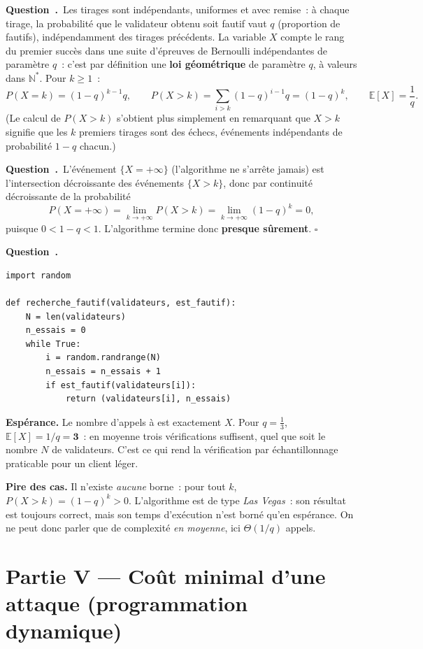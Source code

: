\documentclass[11pt,a4paper]{article}
\renewcommand{\Q}{\medskip\par\stepcounter{qcnt}\noindent\textbf{\color{cnc}Question~\theqcnt.}~}
\begin{document}
\Q Les tirages sont indépendants, uniformes et avec remise~: à chaque tirage, la probabilité
que le validateur obtenu soit fautif vaut $q$ (proportion de fautifs), indépendamment des
tirages précédents. La variable $X$ compte le rang du premier succès dans une suite d'épreuves
de Bernoulli indépendantes de paramètre $q$~: c'est par définition une \textbf{loi géométrique}
de paramètre $q$, à valeurs dans $\mathbb{N}^*$. Pour $k\ge 1$~:
\[ P(X=k) = (1-q)^{k-1}q,\qquad
   P(X>k) = \sum_{i>k}(1-q)^{i-1}q = (1-q)^{k},\qquad
   \mathbb{E}[X] = \frac{1}{q}. \]
(Le calcul de $P(X>k)$ s'obtient plus simplement en remarquant que $X>k$ signifie que les $k$
premiers tirages sont des échecs, événements indépendants de probabilité $1-q$ chacun.)

\Q L'événement $\{X=+\infty\}$ (l'algorithme ne s'arrête jamais) est l'intersection
décroissante des événements $\{X>k\}$, donc par continuité décroissante de la probabilité
\[ P(X=+\infty) = \lim_{k\to+\infty} P(X>k) = \lim_{k\to+\infty}(1-q)^{k} = 0, \]
puisque $0<1-q<1$. L'algorithme termine donc \textbf{presque sûrement}. \hfill$\square$

\Q
\begin{lstlisting}
import random

def recherche_fautif(validateurs, est_fautif):
    N = len(validateurs)
    n_essais = 0
    while True:
        i = random.randrange(N)
        n_essais = n_essais + 1
        if est_fautif(validateurs[i]):
            return (validateurs[i], n_essais)
\end{lstlisting}
\textbf{Espérance.} Le nombre d'appels à  est exactement $X$. Pour
$q=\tfrac13$, $\mathbb{E}[X]=1/q=\mathbf{3}$~: en moyenne trois vérifications suffisent, quel
que soit le nombre $N$ de validateurs. C'est ce qui rend la vérification par échantillonnage
praticable pour un client léger.

\textbf{Pire des cas.} Il n'existe \emph{aucune} borne~: pour tout $k$, $P(X>k)=(1-q)^k>0$.
L'algorithme est de type \emph{Las Vegas}~: son résultat est toujours correct, mais son temps
d'exécution n'est borné qu'en espérance. On ne peut donc parler que de complexité
\emph{en moyenne}, ici $\Theta(1/q)$ appels.

\section*{Partie V --- Coût minimal d'une attaque (programmation dynamique)}
\end{document}
